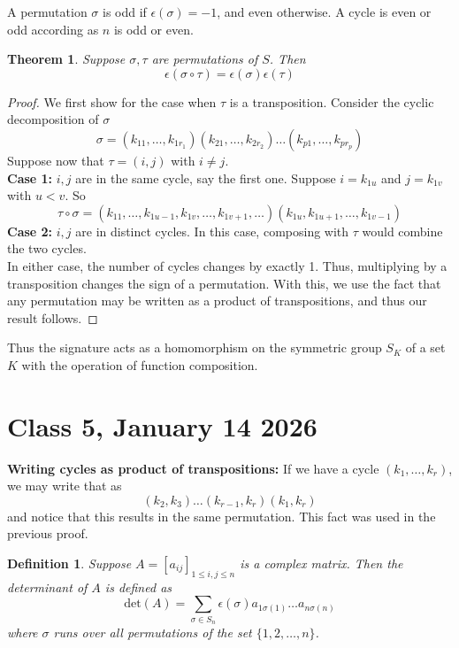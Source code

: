 \documentclass{article}
\newtheorem{theorem}{Theorem}
\newtheorem{definition}{Definition}
\begin{document}
A permutation $\sigma$ is odd if $\epsilon(\sigma)=-1$, and even otherwise. A cycle is even or odd according as $n$ is odd or even.
\begin{theorem}
Suppose $\sigma,\tau$ are permutations of $S$. Then $$\epsilon(\sigma\circ\tau)=\epsilon(\sigma)\epsilon(\tau)$$
\end{theorem}
\begin{proof}
We first show for the case when $\tau$ is a transposition. Consider the cyclic decomposition of $\sigma$
$$\sigma=(k_{11},\dots,k_{1r_1})(k_{21},\dots,k_{2r_2})\dots(k_{p1},\dots,k_{pr_p})$$
Suppose now that $\tau=(i,j)$ with $i\neq j$.\\
\textbf{Case 1:} $i,j$ are in the same cycle, say the first one. Suppose $i=k_{1u}$ and $j=k_{1v}$ with $u<v$. So $$\tau\circ\sigma=(k_{11},\dots,k_{1u-1},k_{1v},\dots,k_{1v+1},\dots)(k_{1u},k_{1u+1},\dots,k_{1v-1})$$
\textbf{Case 2:} $i,j$ are in distinct cycles. In this case, composing with $\tau$ would combine the two cycles.\\
In either case, the number of cycles changes by exactly 1. Thus, multiplying by a transposition changes the sign of a permutation.
With this, we use the fact that any permutation may be written as a product of transpositions, and thus our result follows.
\end{proof}
Thus the signature acts as a homomorphism on the symmetric group $S_K$ of a set $K$ with the operation of function composition.
\section*{Class 5, January 14 2026}
\textbf{Writing cycles as product of transpositions:} If we have a cycle $(k_1,\dots,k_r)$, we may write that as
$$(k_2,k_3)\dots(k_{r-1},k_r)(k_1,k_r)$$
and notice that this results in the same permutation. This fact was used in the previous proof.
\begin{definition}
    Suppose $A=[a_{ij}]_{1\leq i,j\leq n}$ is a complex matrix. Then the determinant of $A$ is defined as
    $$\text{det}(A)=\sum_{\sigma\in S_n}\epsilon(\sigma)a_{1 \sigma(1)}\dots a_{n\sigma(n)}$$
where $\sigma$ runs over all permutations of the set $\{1,2,\dots,n\}$.
\end{definition}
\end{document}
